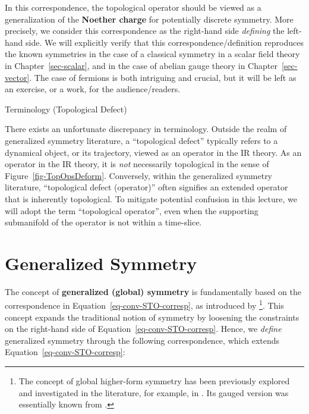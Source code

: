 \documentclass[11pt,toc=bibliography]{scrbook}
\numberwithin{equation}{section}
\begin{document}
In this correspondence, the topological operator should be viewed as a
generalization of the \textbf{Noether charge} for potentially discrete
symmetry. More precisely, we consider this correspondence as the
right-hand side \emph{defining} the left-hand side. We will explicitly
verify that this correspondence/definition reproduces the known
symmetries in the case of a classical symmetry in a scalar field theory
in Chapter~\ref{sec-scalar}, and in the case of abelian gauge theory in
Chapter~\ref{sec-vector}. The case of fermions is both intriguing and
crucial, but it will be left as an exercise, or a work, for the
audience/readers.

\begin{warning}{Terminology (Topological Defect)}

There exists an unfortunate discrepancy in terminology. Outside the
realm of generalized symmetry literature, a ``topological defect''
typically refers to a dynamical object, or its trajectory, viewed as an
operator in the IR theory. As an operator in the IR theory, it is
\emph{not} necessarily topological in the sense of
Figure~\ref{fig-TopOpsDeform}. Conversely, within the generalized
symmetry literature, ``topological defect (operator)'' often signifies
an extended operator that is inherently topological. To mitigate
potential confusion in this lecture, we will adopt the term
``topological operator'', even when the supporting submanifold of the
operator is not within a time-slice.

\end{warning}

\section{Generalized Symmetry}\label{generalized-symmetry}

The concept of \textbf{generalized (global) symmetry} is fundamentally
based on the correspondence in Equation~\ref{eq-conv-STO-corresp}, as
introduced by \autocite{Gaiotto:2014kfa} \footnote{The concept of global
  higher-form symmetry has been previously explored and investigated in
  the literature, for example, in
  \autocite{Kapustin:2013uxa,Barkeshli:2014cna}. Its gauged version was
  essentially known from \autocite{KalbRamond}.}. This concept expands
the traditional notion of symmetry by loosening the constraints on the
right-hand side of Equation~\ref{eq-conv-STO-corresp}. Hence, we
\emph{define} generalized symmetry through the following correspondence,
which extends Equation~\ref{eq-conv-STO-corresp}:
\end{document}
